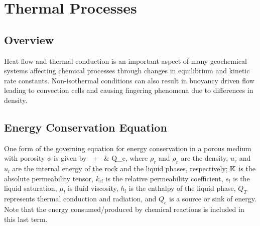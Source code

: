 %
%

\section{Thermal Processes}
\label{sec:thermal}

\subsection{Overview}

Heat flow and thermal conduction is an important aspect of many geochemical systems 
affecting chemical processes through changes in equilibrium and kinetic rate constants. 
Non-isothermal conditions can also result in buoyancy driven flow leading to convection cells 
and causing fingering phenomena due to differences in density.


\subsection{Energy Conservation Equation}
\label{sec:Energy}
\label{sec:thermal-model}


One form of the governing equation for energy conservation in a porous medium with porosity $\phi$ is given by
\BA\label{eq:energy_balance}
    \ 
  + \ &
  \boldsymbol{\nabla} \cdot {} 
  \eq 
  Q_e,
\EA
where
$\rho_{r}$ and $\rho_{r}$ are the density, 
$u_{r}$ and $u_l$ are the internal energy 
of the rock and the liquid phases, respectively;
${\mathbb K}$ is the absolute permeability tensor,
$k_{rl}$ is the relative permeability coefficient,
$s_l$ is the liquid saturation,
$\mu_l$ is fluid viscosity,
$h_l$ is the enthalpy of the liquid phase, 
$Q_T$ represents thermal conduction and radiation, and 
$Q_{e} $ is a source or sink of energy. 
Note that the energy consumed/produced by chemical reactions is included in this last term. 


